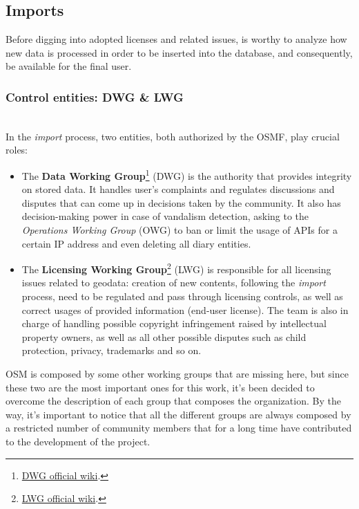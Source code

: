 \subsection{Imports}
Before digging into adopted licenses and related issues, is worthy to analyze how new data is processed in order to be inserted into the database, and consequently, be available for the final user.

\subsubsection{Control entities: DWG \& LWG}~\\ \newline
In the \textit{import} process, two entities, both authorized by the OSMF, play crucial roles:
\begin{itemize}
    \item The \textbf{Data Working Group}\footnote{\href{https://wiki.osmfoundation.org/wiki/Data_Working_Group}{DWG official wiki}.} (DWG) is the authority that provides integrity on stored data. It handles user's complaints and regulates discussions and disputes that can come up in decisions taken by the community. It also has decision-making power in case of vandalism detection, asking to the \textit{Operations Working Group} (OWG) to ban or limit the usage of APIs for a certain IP address and even deleting all diary entities.
    \item The \textbf{Licensing Working Group}\footnote{\href{https://wiki.osmfoundation.org/wiki/Licensing_Working_Group}{LWG official wiki}.} (LWG) is responsible for all licensing issues related to geodata: creation of new contents, following the \textit{import} process, need to be regulated and pass through licensing controls, as well as correct usages of provided information (end-user license).
    The team is also in charge of handling possible copyright infringement raised by intellectual property owners, as well as all other possible disputes such as child protection, privacy, trademarks and so on.
\end{itemize}
OSM is composed by some other working groups that are missing here, but since these two are the most important ones for this work, it's been decided to overcome the description of each group that composes the organization.
By the way, it's important to notice that all the different groups are always composed by a restricted number of community members that for a long time have contributed to the development of the project.

